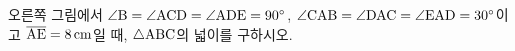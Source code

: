 \noindent\begin{minipage}[t]{0.58\linewidth}\vspace{0pt}\raggedright 오른쪽 그림에서 $\angle\mathrm{B}=\angle\mathrm{ACD}=\angle\mathrm{ADE}=90^\circ$, $\angle\mathrm{CAB}=\angle\mathrm{DAC}=\angle\mathrm{EAD}=30^\circ$이고 $\overline{\mathrm{AE}}=8\,\mathrm{cm}$일 때, $\triangle\mathrm{ABC}$의 넓이를 구하시오.\end{minipage}\hfill\begin{minipage}[t]{0.4\linewidth}\vspace{0pt}\centering \resizebox{\ifdim\width>\linewidth\linewidth\else\width\fi}{!}{}\end{minipage}\par

